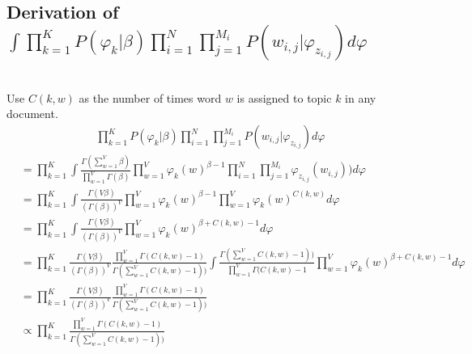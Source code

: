 \subsection{Derivation of $\int \prod\limits_{k=1}^K P(\varphi_k|\beta) \prod^N_{i=1}\prod^{M_i}_{j=1} P(w_{i,j}|\varphi_{z_{i,j}}) d\varphi$}
~\\Use $C(k,w)$ as the number of times word $w$ is assigned to topic $k$ in any document.
\begin{align}
\prod\limits_{k=1}^K P(\varphi_k|\beta) \prod^N_{i=1}\prod^{M_i}_{j=1} P(w_{i,j}|\varphi_{z_{i,j}}) d\varphi
\end{align}
\begin{align}
&= \prod\limits_{k=1}^K \int\frac{\Gamma (\sum\limits_{w=1}^V \beta)}{\prod\limits_{w=1}^V \Gamma(\beta)} \prod\limits_{w=1}^V  \varphi_{k}(w)^{\beta-1}  \prod^N_{i=1}\prod^{M_i}_{j=1} \varphi_{z_{i,j}}(w_{i,j})) d\varphi\\
&= \prod\limits_{k=1}^K \int \frac{\Gamma (V \beta)}{(\Gamma(\beta))^V} \prod\limits_{w=1}^V  \varphi_{k}(w)^{\beta-1}  \prod\limits_{w=1}^V \varphi_{k}(w)^{C(k,w)} d\varphi\\
&= \prod\limits_{k=1}^K \int \frac{\Gamma (V \beta)}{(\Gamma(\beta))^V}  \prod\limits_{w=1}^V \varphi_{k}(w)^{\beta + C(k,w) -1} d\varphi\\
&= \prod\limits_{k=1}^K \frac{\Gamma (V \beta)}{(\Gamma(\beta))^V}  \frac{\prod\limits_{w=1}^V \Gamma(C(k,w)-1)}{\Gamma(\sum\limits_{w=1}^V C(k,w)-1))} \int \frac{\Gamma(\sum\limits_{w=1}^V C(k,w)-1))}{\prod\limits_{w=1}^V \Gamma(C(k,w)-1}  \prod\limits_{w=1}^V \varphi_{k}(w)^{\beta + C(k,w) -1} d\varphi\\
&=  \prod\limits_{k=1}^K \frac{\Gamma (V \beta)}{(\Gamma(\beta))^V}  \frac{\prod\limits_{w=1}^V \Gamma(C(k,w)-1)}{\Gamma(\sum\limits_{w=1}^V C(k,w)-1))}\\
&\propto \prod\limits_{k=1}^K \frac{\prod\limits_{w=1}^V \Gamma(C(k,w)-1)}{\Gamma(\sum\limits_{w=1}^V C(k,w)-1))}
\end{align}
